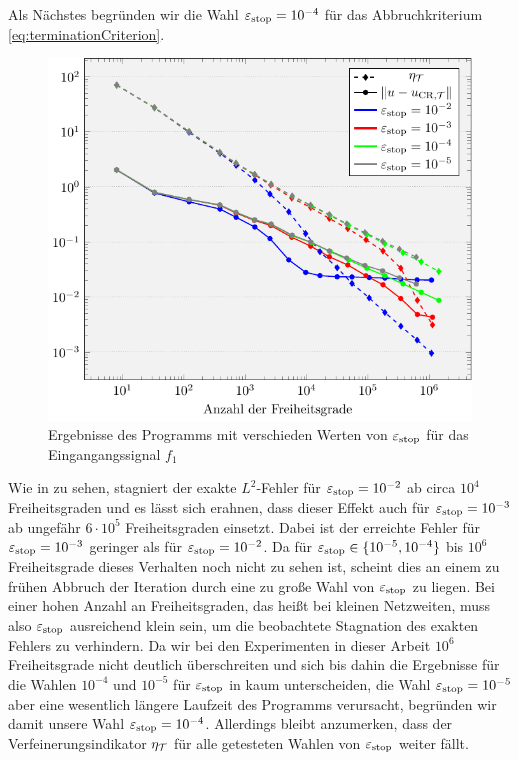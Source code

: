 Als Nächstes begründen wir die Wahl $\varepsilon_{\textup{stop}} = 10^{-4}$ für das
Abbruchkriterium \eqref{eq:terminationCriterion}.
\begin{figure}[p]
  \centering
  \includegraphics[width=.8\linewidth]
    {pictures/chapExperiments/secParameters/parEpsStop/f01/convergenceF.pdf}
  \caption{Ergebnisse des Programms mit verschieden Werten von $\varepsilon_{\textup{stop}}$ für
    das Eingangangssignal $f_1$}
  \label{fig:parEpsStopConvergence}
\end{figure}
Wie in  zu sehen, stagniert der exakte
$L^2$-Fehler für $\varepsilon_{\textup{stop}}=10^{-2}$ ab circa $10^4$ Freiheitsgraden und es
lässt sich erahnen, dass dieser Effekt auch für $\varepsilon_{\textup{stop}}=10^{-3}$ ab ungefähr
$6\cdot 10^5$ Freiheitsgraden einsetzt.  
Dabei ist der erreichte Fehler für $\varepsilon_{\textup{stop}}=10^{-3}$ geringer als
für $\varepsilon_{\textup{stop}}=10^{-2}$.
Da für $\varepsilon_{\textup{stop}}\in\{10^{-5},10^{-4}\}$ bis $10^6$ Freiheitsgrade dieses
Verhalten noch nicht zu sehen ist, scheint dies an einem zu frühen Abbruch der
Iteration durch eine zu große Wahl von $\varepsilon_{\textup{stop}}$ zu liegen. 
Bei einer hohen Anzahl an Freiheitsgraden, das heißt bei kleinen Netzweiten,
muss also $\varepsilon_{\textup{stop}}$ ausreichend klein sein, um die beobachtete Stagnation
des exakten Fehlers zu verhindern.
Da wir bei den Experimenten in dieser Arbeit $10^6$ Freiheitsgrade nicht
deutlich überschreiten und sich bis dahin die Ergebnisse für die Wahlen
$10^{-4}$ und $10^{-5}$ für $\varepsilon_{\textup{stop}}$ in  kaum
unterscheiden, die Wahl $\varepsilon_{\textup{stop}}=10^{-5}$ aber eine wesentlich längere
Laufzeit des Programms verursacht, begründen wir damit unsere Wahl
$\varepsilon_{\textup{stop}}=10^{-4}$.
Allerdings bleibt anzumerken, dass der Verfeinerungsindikator $\eta_{\mathcal{T}}$ für alle
getesteten Wahlen von $\varepsilon_{\textup{stop}}$ weiter fällt. 
